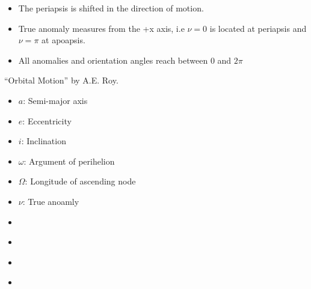 \documentclass[letterpaper,10pt,english]{sphinxmanual}
\begin{document}
\begin{fulllineitems}
\begin{description}
\begin{itemize}
\item {} 
The periapsis is shifted in the direction of motion.

\item {} 
True anomaly measures from the +x axis, i.e \(\nu = 0\) is located at periapsis and \(\nu = \pi\) at apoapsis.

\item {} 
All anomalies and orientation angles reach between 0 and \(2\pi\)

\end{itemize}

 “Orbital Motion” by A.E. Roy.

\item[{\sphinxstylestrong{Variables:}}] \leavevmode\begin{itemize}
\item {} 
\(a\): Semi-major axis

\item {} 
\(e\): Eccentricity

\item {} 
\(i\): Inclination

\item {} 
\(\omega\): Argument of perihelion

\item {} 
\(\Omega\): Longitude of ascending node

\item {} 
\(\nu\): True anoamly

\end{itemize}

\item[{\sphinxstylestrong{Uses:}}] \leavevmode\begin{itemize}
\item {} 
{\hyperref[\detokenize{modules/dpt_tools:dpt_tools.kep2cart}]{}}

\item {} 
{\hyperref[\detokenize{modules/dpt_tools:dpt_tools.cart2kep}]{}}

\item {} 
{\hyperref[\detokenize{modules/dpt_tools:dpt_tools.mean2true}]{}}

\item {} 
{\hyperref[\detokenize{modules/dpt_tools:dpt_tools.true2mean}]{}}


\end{itemize}
\end{description}
\end{fulllineitems}
\end{document}
